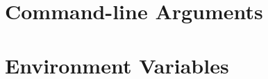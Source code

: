 \documentclass{beamer}
\begin{document}
\section{Command-line Arguments}
\section{Environment Variables}


\nocite{raab2017introducing}

\appendix

\begin{frame}[allowframebreaks]
	
	
\end{frame}
\end{document}
